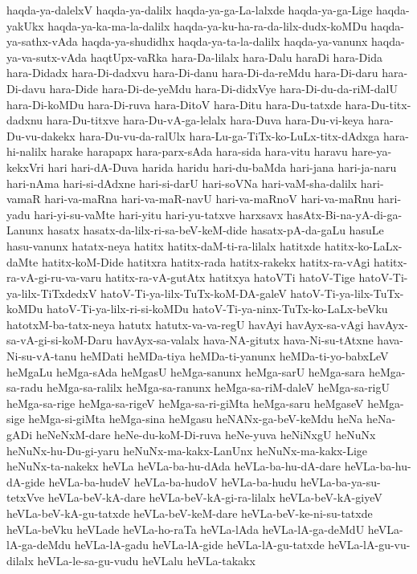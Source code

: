 {haqda-ya-dalelxV
haqda-ya-dalilx
haqda-ya-ga-La-lalxde
haqda-ya-ga-Lige
haqda-yakUkx
haqda-ya-ka-ma-la-dalilx
haqda-ya-ku-ha-ra-da-lilx-dudx-koMDu
haqda-ya-sathx-vAda
haqda-ya-shudidhx
haqda-ya-ta-la-dalilx
haqda-ya-vanunx
haqda-ya-va-sutx-vAda
haqtUpx-vaRka
hara-Da-lilalx
hara-Dalu
haraDi
hara-Dida
hara-Didadx
hara-Di-dadxvu
hara-Di-danu
hara-Di-da-reMdu
hara-Di-daru
hara-Di-davu
hara-Dide
hara-Di-de-yeMdu
hara-Di-didxVye
hara-Di-du-da-riM-dalU
hara-Di-koMDu
hara-Di-ruva
hara-DitoV
hara-Ditu
hara-Du-tatxde
hara-Du-titx-dadxnu
hara-Du-titxve
hara-Du-vA-ga-lelalx
hara-Duva
hara-Du-vi-keya
hara-Du-vu-dakekx
hara-Du-vu-da-ralUlx
hara-Lu-ga-TiTx-ko-LuLx-titx-dAdxga
hara-hi-nalilx
harake
harapapx
hara-parx-sAda
hara-sida
hara-vitu
haravu
hare-ya-kekxVri
hari
hari-dA-Duva
harida
haridu
hari-du-baMda
hari-jana
hari-ja-naru
hari-nAma
hari-si-dAdxne
hari-si-darU
hari-soVNa
hari-vaM-sha-dalilx
hari-vamaR
hari-va-maRna
hari-va-maR-navU
hari-va-maRnoV
hari-va-maRnu
hari-yadu
hari-yi-su-vaMte
hari-yitu
hari-yu-tatxve
harxsavx
hasAtx-Bi-na-yA-di-ga-Lanunx
hasatx
hasatx-da-lilx-ri-sa-beV-keM-dide
hasatx-pA-da-gaLu
hasuLe
hasu-vanunx
hatatx-neya
hatitx
hatitx-daM-ti-ra-lilalx
hatitxde
hatitx-ko-LaLx-daMte
hatitx-koM-Dide
hatitxra
hatitx-rada
hatitx-rakekx
hatitx-ra-vAgi
hatitx-ra-vA-gi-ru-va-varu
hatitx-ra-vA-gutAtx
hatitxya
hatoVTi
hatoV-Tige
hatoV-Ti-ya-lilx-TiTxdedxV
hatoV-Ti-ya-lilx-TuTx-koM-DA-galeV
hatoV-Ti-ya-lilx-TuTx-koMDu
hatoV-Ti-ya-lilx-ri-si-koMDu
hatoV-Ti-ya-ninx-TuTx-ko-LaLx-beVku
hatotxM-ba-tatx-neya
hatutx
hatutx-va-va-regU
havAyi
havAyx-sa-vAgi
havAyx-sa-vA-gi-si-koM-Daru
havAyx-sa-valalx
hava-NA-gitutx
hava-Ni-su-tAtxne
hava-Ni-su-vA-tanu
heMDati
heMDa-tiya
heMDa-ti-yanunx
heMDa-ti-yo-babxLeV
heMgaLu
heMga-sAda
heMgasU
heMga-sanunx
heMga-sarU
heMga-sara
heMga-sa-radu
heMga-sa-ralilx
heMga-sa-ranunx
heMga-sa-riM-daleV
heMga-sa-rigU
heMga-sa-rige
heMga-sa-rigeV
heMga-sa-ri-giMta
heMga-saru
heMgaseV
heMga-sige
heMga-si-giMta
heMga-sina
heMgasu
heNANx-ga-beV-keMdu
heNa
heNa-gADi
heNeNxM-dare
heNe-du-koM-Di-ruva
heNe-yuva
heNiNxgU
heNuNx
heNuNx-hu-Du-gi-yaru
heNuNx-ma-kakx-LanUnx
heNuNx-ma-kakx-Lige
heNuNx-ta-nakekx
heVLa
heVLa-ba-hu-dAda
heVLa-ba-hu-dA-dare
heVLa-ba-hu-dA-gide
heVLa-ba-hudeV
heVLa-ba-hudoV
heVLa-ba-hudu
heVLa-ba-ya-su-tetxVve
heVLa-beV-kA-dare
heVLa-beV-kA-gi-ra-lilalx
heVLa-beV-kA-giyeV
heVLa-beV-kA-gu-tatxde
heVLa-beV-keM-dare
heVLa-beV-ke-ni-su-tatxde
heVLa-beVku
heVLade
heVLa-ho-raTa
heVLa-lAda
heVLa-lA-ga-deMdU
heVLa-lA-ga-deMdu
heVLa-lA-gadu
heVLa-lA-gide
heVLa-lA-gu-tatxde
heVLa-lA-gu-vu-dilalx
heVLa-le-sa-gu-vudu
heVLalu
heVLa-takakx
}
